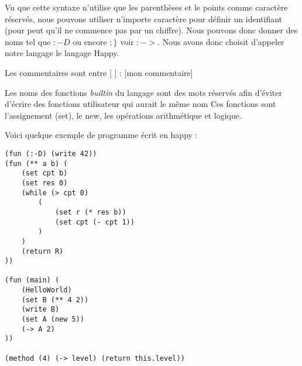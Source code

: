 Vu que cette syntaxe n'utilise que les parenthèses et le points comme caractère réservés, nous pouvons utiliser n'importe caractère pour définir
un identifiant (pour peut qu'il ne commence pas par un chiffre). Nous pouvons donc donner des noms tel que $:-D$ ou encore $;\}$ voir $:->$. Nous avons donc choisit d'appeler notre
langage le langage Happy. 

Les commentaires sont entre [ ] : [mon commentaire]

Les noms des fonctions \textit{builtin} du langage sont des mots réservés afin d'éviter d'écrire des fonctions utilisateur qui aurait le même nom
Ces fonctions sont l'assignement (set), le new, les opérations arithmétique et logique.

Voici quelque exemple de programme écrit en happy : 
\begin{verbatim}
(fun (:-D) (write 42))
(fun (** a b) (
	(set cpt b)
	(set res 0)
	(while (> cpt 0) 
		(
			(set r (* res b))
			(set cpt (- cpt 1))	
		)
	)
	(return R)
))

(fun (main) (
	(HelloWorld)
	(set B (** 4 2))
	(write B)
	(set A (new 5))
	(-> A 2)
))

(method (4) (-> level) (return this.level))

\end{verbatim}
